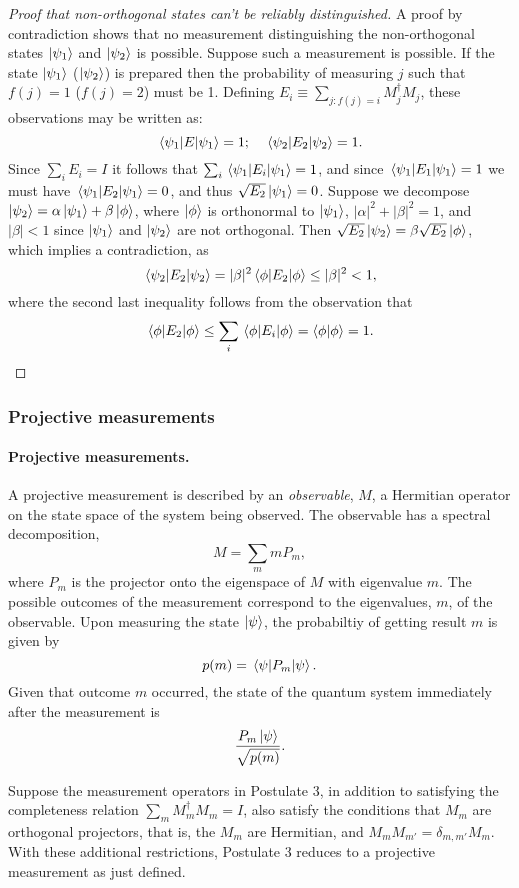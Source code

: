 \documentclass{article}
\numberwithin{theorem}{section}
\numberwithin{corollary}{section}
\numberwithin{postulate}{section}
\begin{document}
\begin{proof}[Proof that non-orthogonal states can't be reliably
distinguished]
  A proof by contradiction shows that no measurement distinguishing the
  non-orthogonal states $\ket{\psi_1}$ and $\ket{\psi_2}$ is possible. Suppose
  such a measurement is possible. If the state $\ket{\psi_1}$ ($\ket{\psi_2}$)
  is prepared then the probability of measuring $j$ such that $f(j) = 1$ ($f(j)
  = 2$) must be 1. Defining $E_i \equiv \sum_{j: f(j) = i} M_j^{\dagger}M_j$,
  these observations may be written as: \[
    \ev{E}{\psi_1} = 1; \quad
    \ev{E_2}{\psi_2} = 1.
  \] Since $\sum_i E_i = I$ it follows that $\sum_i \ev{E_i}{\psi_1} = 1$, and
  since $\ev{E_1}{\psi_1} = 1$ we must have $\ev{E_2}{\psi_1} = 0$, and thus
  $\sqrt{E_2}\ket{\psi_1} = 0$. Suppose we decompose $\ket{\psi_2} =
  \alpha\ket{\psi_1} + \beta\ket{\phi}$, where $\ket{\phi}$ is orthonormal to
  $\ket{\psi_1}$, $|\alpha|^2 + |\beta|^2 = 1$, and $|\beta| < 1$ since
  $\ket{\psi_1}$ and $\ket{\psi_2}$ are not orthogonal. Then
  $\sqrt{E_2}\ket{\psi_2} = \beta\sqrt{E_2}\ket{\phi}$, which implies a
  contradiction, as \[
    \ev{E_2}{\psi_2} = |\beta|^2\ev{E_2}{\phi} \leq |\beta|^2 < 1,
  \] where the second last inequality follows from the observation that \[
    \ev{E_2}{\phi} \leq \sum_i \ev{E_i}{\phi} = \ip{\phi} = 1.
  \]
\end{proof}

\subsubsection{Projective measurements}

\paragraph{Projective measurements.} A projective measurement is described by
an \emph{observable}, $M$, a Hermitian operator on the state space of the
system being observed. The observable has a spectral decomposition, \[
  M = \sum_m mP_m,
\] where $P_m$ is the projector onto the eigenspace of $M$ with eigenvalue $m$.
The possible outcomes of the measurement correspond to the eigenvalues, $m$, of
the observable. Upon measuring the state $\ket{\psi}$, the probabiltiy of
getting result $m$ is given by \[
  p(m) = \ev{P_m}{\psi}.
\] Given that outcome $m$ occurred, the state of the quantum system immediately
after the measurement is \[
  \frac{P_m\ket{\psi}}{\sqrt{p(m)}}.
\]

Suppose the measurement operators in Postulate 3, in addition to satisfying the
completeness relation $\sum_m M_m^{\dagger}M_m = I$, also satisfy the
conditions that $M_m$ are orthogonal projectors, that is, the $M_m$ are
Hermitian, and $M_mM_{m'} = \delta_{m, m'}M_m$. With these additional
restrictions, Postulate 3 reduces to a projective measurement as just defined.
\end{document}
